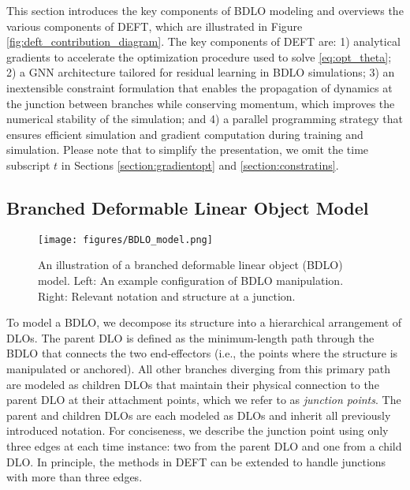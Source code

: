 This section introduces the key components of BDLO modeling and overviews the various components of DEFT, which are illustrated in Figure \ref{fig:deft_contribution_diagram}. 
The key components of DEFT are:
1) analytical gradients to accelerate the optimization procedure used to solve \eqref{eq:opt_theta};
2) a GNN architecture tailored for residual learning in BDLO simulations;
3) an inextensible constraint formulation that enables the propagation of dynamics at the junction between branches while conserving momentum, which improves the numerical stability of the simulation; 
and 4) a parallel programming strategy that ensures efficient simulation and gradient computation during training and simulation.
Please note that to simplify the presentation, we omit the time subscript $t$ in Sections \ref{section:gradientopt} and \ref{section:constratins}.


\subsection{Branched Deformable Linear Object Model}
\label{sec:BDLO model}
\begin{figure}[t]
    \centering
    \texttt{[image: figures/BDLO\_model.png]}
    \caption{
    An illustration of a branched deformable linear object (BDLO) model.
    Left: An example configuration of BDLO manipulation.
    Right: Relevant notation and structure at a junction.}
    \label{fig:BDLO}
\end{figure}

To model a BDLO, we decompose its structure into a hierarchical arrangement of DLOs. 
The parent DLO is defined as the minimum-length path through the BDLO that connects the two end-effectors (i.e., the points where the structure is manipulated or anchored). 
All other branches diverging from this primary path are modeled as children DLOs that maintain their physical connection to the parent DLO at their attachment points, which we refer to as \emph{junction points}.
The parent and children DLOs are each modeled as DLOs and inherit all previously introduced notation.
For conciseness, we describe the junction point using only three edges at each time instance: two from the parent DLO and one from a child DLO. 
In principle, the methods in DEFT can be extended to handle junctions with more than three edges. 

